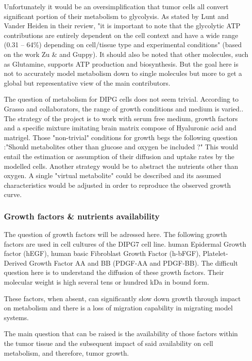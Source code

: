 \documentclass[11pt,a4paper]{article}
\begin{document}
Unfortunately it would be an oversimplification that tumor cells all convert significant portion of their metabolism to glycolysis. As stated by Lunt and Vander Heiden in their review, "it is important to note that the glycolytic ATP contributions are entirely dependent on the cell context and have a wide range (0.31 – 64\%) depending on cell/tissue type and experimental conditions"\cite{Lunt2011} (based on the work Zu \& and Guppy\cite{Zu2004}). It should also be noted that other molecules, such as Glutamine, supports ATP production and biosynthesis. But the goal here is not to accurately model metabolism down to single molecules but more to get a global but representative view  of the main contributors.

The question of metabolism for DIPG cells does not seem trivial. According to Grasso and collaborators, the range of growth conditions and medium is varied.\cite{Grasso2015}. The strategy of the project is to work with serum free medium, growth factors and a specific mixture imitating brain matrix compose of Hyaluronic acid and matrigel. Those "non-trivial" conditions for growth begs the following question :"Should metabolites other than glucose and oxygen be included ?" This would entail the estimation or assumption of their diffusion and uptake rates by the modelled cells. Another strategy would be to abstract the nutrients other than oxygen. A single "virtual metabolite" could be described and its assumed characteristics would be adjusted in order to reproduce the observed growth curve. 

\subsubsection{Growth factors \& nutrients availability}
The question of growth factors will be adressed here. The following growth factors are used in cell cultures of the DIPG7 cell line. human Epidermal Growth factor (hEGF), human basic Fibroblast Growth Factor (h-bFGF), Platelet-Derived Growth Factor AA and BB (PDGF-AA and PDGF-BB). The difficult question here is to understand the diffusion of these growth factors. Their molecular weight is high several tens or hundred kDa in bound form.\cite{Taylor1970}

These factors, when absent, can significantly slow down growth through impact on metabolism \cite{Heiden2001} and there is a loss of migration capability in migrating model systems. 

The main question that can be raised is the availability of those factors within the tumor tissue and the subsequent impact of said availability on cell metabolism, and therefore, tumor growth. 
\end{document}
